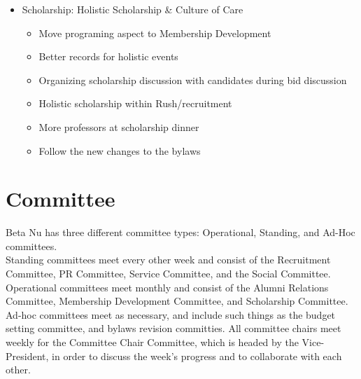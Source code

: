 \begin{itemize}
		\item Scholarship: Holistic Scholarship \& Culture of Care
		  \begin{itemize}
		   \item Move programing aspect to Membership Development
		   \item Better records for holistic events
		   \item Organizing scholarship discussion with candidates during bid discussion
		   \item Holistic scholarship within Rush/recruitment
		   \item More professors at scholarship dinner
		   \item Follow the new changes to the bylaws
		  \end{itemize}

	\end{itemize} 
    \section*{Committee}
    
	Beta Nu has three different committee types: Operational, Standing, and Ad-Hoc committees. \\
	
	Standing committees meet every other week and consist of the Recruitment Committee, PR Committee, Service Committee, and the Social Committee. Operational committees meet monthly and consist of the Alumni Relations Committee, Membership Development Committee, and Scholarship Committee. Ad-hoc committees meet as necessary, and include such things as the budget setting committee, and bylaws revision committies. All committee chairs meet weekly for the Committee Chair Committee, which is headed by the Vice-President, in order to discuss the week’s progress and to collaborate with each other.
	
